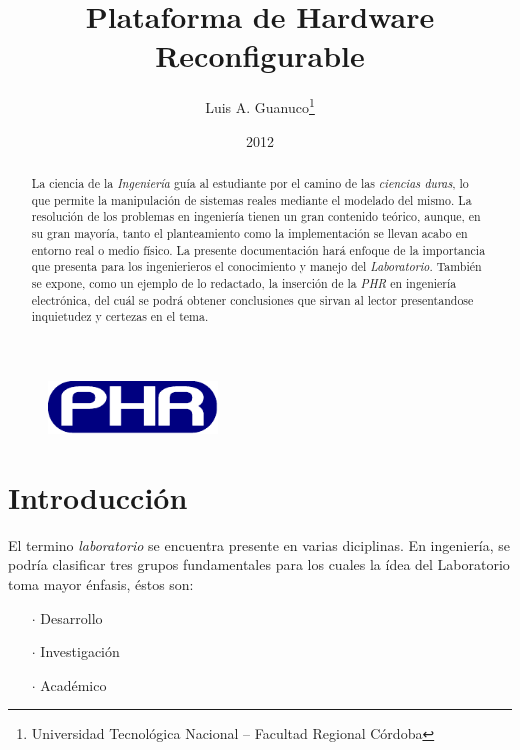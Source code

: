 \documentclass[a4paper]{article}
\author{Luis A. Guanuco\thanks{Universidad Tecnológica Nacional -- Facultad Regional Córdoba}}
\title{Plataforma de Hardware Reconfigurable}
\date{2012}
\begin{document}
\maketitle
\begin{figure}[h]
  \centering
  \includegraphics[width=0.4\textwidth]{images/logov2_ES}
\end{figure}

\begin{abstract} 
  La ciencia de la \emph{Ingeniería} guía al estudiante por el camino de las \emph{ciencias duras}, lo que permite la manipulación de sistemas reales mediante el modelado del mismo. La resolución de los problemas en ingeniería tienen un gran contenido teórico, aunque, en su gran mayoría, tanto el planteamiento como la implementación se llevan acabo en entorno real o medio físico. La presente documentación hará enfoque de la importancia que presenta para los ingenierieros el conocimiento y manejo del \emph{Laboratorio}. También se expone, como un ejemplo de lo redactado, la inserción de la \emph{\ac{PHR}} en ingeniería electrónica, del cuál se podrá obtener conclusiones que sirvan al lector presentandose inquietudez y certezas en el tema.
\end{abstract}

\section{Introducción}
\label{sec:intro}
El termino \emph{laboratorio} se encuentra presente en varias diciplinas. En ingeniería, se podría clasificar tres grupos fundamentales para los cuales la ídea del Laboratorio toma mayor énfasis, éstos son:
\begin{itemize}
\item[$\cdot$] Desarrollo
\item[$\cdot$] Investigación
\item[$\cdot$] Académico
\end{itemize}
\end{document}
